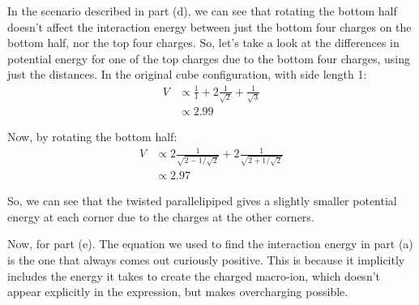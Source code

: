 \documentclass{article}
\begin{document}
In the scenario described in part (d), we can see that rotating the bottom half doesn't affect the interaction energy between just the bottom four charges on the bottom half, nor the top four charges. So, let's take a look at the differences in potential energy for one of the top charges due to the bottom four charges, using just the distances. In the original cube configuration, with side length 1:
\[
\begin{aligned}
	V &\propto \frac{1}{1} + 2\frac{1}{\sqrt{2}} + \frac{1}{\sqrt{3}} \\
	&\propto 2.99
\end{aligned}
\]


Now, by rotating the bottom half:
\[
\begin{aligned}
	V &\propto 2\frac{1}{\sqrt{2-1/\sqrt{2}}} + 2\frac{1}{\sqrt{2+1/\sqrt{2}}} \\
	&\propto 2.97
\end{aligned}
\]


So, we can see that the twisted parallelipiped gives a slightly smaller potential energy at each corner due to the charges at the other corners.

Now, for part (e). The equation we used to find the interaction energy in part (a) is the one that always comes out curiously positive. This is because it implicitly includes the energy it takes to create the charged macro-ion, which doesn't appear explicitly in the expression, but makes overcharging possible.
\end{document}
